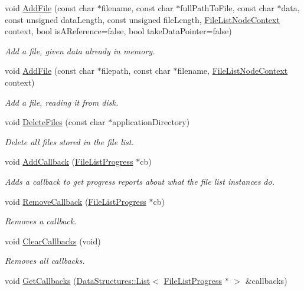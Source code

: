 \begin{DoxyCompactItemize}
void \hyperlink{class_rak_net_1_1_file_list_aabddbe6982e76d9c3baaa5d09c7f6555}{Add\-File} (const char $\ast$filename, const char $\ast$full\-Path\-To\-File, const char $\ast$data, const unsigned data\-Length, const unsigned file\-Length, \hyperlink{struct_file_list_node_context}{File\-List\-Node\-Context} context, bool is\-A\-Reference=false, bool take\-Data\-Pointer=false)
\begin{DoxyCompactList}\small\item\em Add a file, given data already in memory. \end{DoxyCompactList}\item 
void \hyperlink{class_rak_net_1_1_file_list_a420660409c9e429a1ff893d24e862dc4}{Add\-File} (const char $\ast$filepath, const char $\ast$filename, \hyperlink{struct_file_list_node_context}{File\-List\-Node\-Context} context)
\begin{DoxyCompactList}\small\item\em Add a file, reading it from disk. \end{DoxyCompactList}\item 
void \hyperlink{class_rak_net_1_1_file_list_abf181cf92f85f0682e26096fdbca92c0}{Delete\-Files} (const char $\ast$application\-Directory)
\begin{DoxyCompactList}\small\item\em Delete all files stored in the file list. \end{DoxyCompactList}\item 
void \hyperlink{class_rak_net_1_1_file_list_acc6df188100d1116080b302315143f86}{Add\-Callback} (\hyperlink{class_rak_net_1_1_file_list_progress}{File\-List\-Progress} $\ast$cb)
\begin{DoxyCompactList}\small\item\em Adds a callback to get progress reports about what the file list instances do. \end{DoxyCompactList}\item 
void \hyperlink{class_rak_net_1_1_file_list_a5d445614a63cd9341db02861974d64c8}{Remove\-Callback} (\hyperlink{class_rak_net_1_1_file_list_progress}{File\-List\-Progress} $\ast$cb)
\begin{DoxyCompactList}\small\item\em Removes a callback. \end{DoxyCompactList}\item 
\hypertarget{class_rak_net_1_1_file_list_aeb148bec17223bfaba6eb0ad496cd0ef}{void \hyperlink{class_rak_net_1_1_file_list_aeb148bec17223bfaba6eb0ad496cd0ef}{Clear\-Callbacks} (void)}\label{class_rak_net_1_1_file_list_aeb148bec17223bfaba6eb0ad496cd0ef}

\begin{DoxyCompactList}\small\item\em Removes all callbacks. \end{DoxyCompactList}\item 
void \hyperlink{class_rak_net_1_1_file_list_a1a193c36458156c59df8b44b8012eee9}{Get\-Callbacks} (\hyperlink{class_data_structures_1_1_list}{Data\-Structures\-::\-List}$<$ \hyperlink{class_rak_net_1_1_file_list_progress}{File\-List\-Progress} $\ast$ $>$ \&callbacks)
\end{DoxyCompactItemize}

